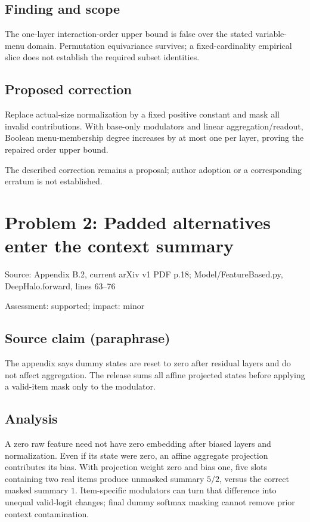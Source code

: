 \documentclass[11pt]{article}
\begin{document}
\subsection*{Finding and scope}

The one-layer interaction-order upper bound is false over the stated variable-menu domain. Permutation equivariance survives; a fixed-cardinality empirical slice does not establish the required subset identities.

\subsection*{Proposed correction}

Replace actual-size normalization by a fixed positive constant and mask all invalid contributions. With base-only modulators and linear aggregation/readout, Boolean menu-membership degree increases by at most one per layer, proving the repaired order upper bound.

The described correction remains a proposal; author adoption or a corresponding erratum is not established.

\section*{Problem 2: Padded alternatives enter the context summary}

Source: Appendix B.2, current arXiv v1 PDF p.18; Model/FeatureBased.py, DeepHalo.forward, lines 63–76

Assessment: supported; impact: minor

\subsection*{Source claim (paraphrase)}

The appendix says dummy states are reset to zero after residual layers and do not affect aggregation. The release sums all affine projected states before applying a valid-item mask only to the modulator.

\subsection*{Analysis}

A zero raw feature need not have zero embedding after biased layers and normalization. Even if its state were zero, an affine aggregate projection contributes its bias. With projection weight zero and bias one, five slots containing two real items produce unmasked summary \(5/2\), versus the correct masked summary \(1\). Item-specific modulators can turn that difference into unequal valid-logit changes; final dummy softmax masking cannot remove prior context contamination.
\end{document}
